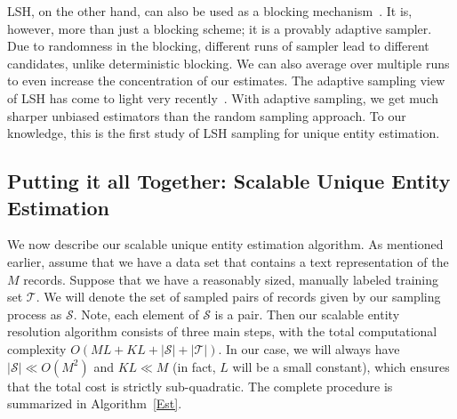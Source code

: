 \documentclass{imsart}
\begin{document}
LSH, on the other hand, can also be used as a blocking mechanism~\citep{steorts14comparison}. It is, however, more than just a blocking scheme; it is a provably adaptive sampler.
Due to randomness in the blocking, different runs of sampler lead to different candidates, unlike deterministic blocking. We can also average over multiple runs to even increase the concentration of our estimates. The adaptive sampling view of LSH has come to light very recently~\citep{spring2017scalable,spring2017new,luo2017Arrays}. With adaptive sampling, we get much sharper unbiased estimators than the random sampling approach. To our knowledge, this is the first study of LSH sampling for unique entity estimation.

\subsection{Putting it all Together: Scalable Unique Entity Estimation}
\label{putit}

We now describe our scalable unique entity estimation algorithm.  As mentioned earlier, assume that we have a data set that contains a text representation of the $M$ records. Suppose that we have a reasonably sized, manually labeled training set $\mathcal{T}$. We will denote the set of sampled pairs of records given by our sampling process as $\mathcal{S}$. Note, each element of $\mathcal{S}$ is a pair. Then our scalable entity resolution algorithm consists of three main steps, with the total computational complexity $O(ML+ KL +|\mathcal{S}| +|\mathcal{T}|)$.  In our case, we will always have $|\mathcal{S}| \ll O(M^2)$ and $KL \ll M$ (in fact, $L$ will be a small constant), which ensures that the total cost is strictly sub-quadratic. The complete procedure is summarized in Algorithm~\ref{Est}.
\end{document}
